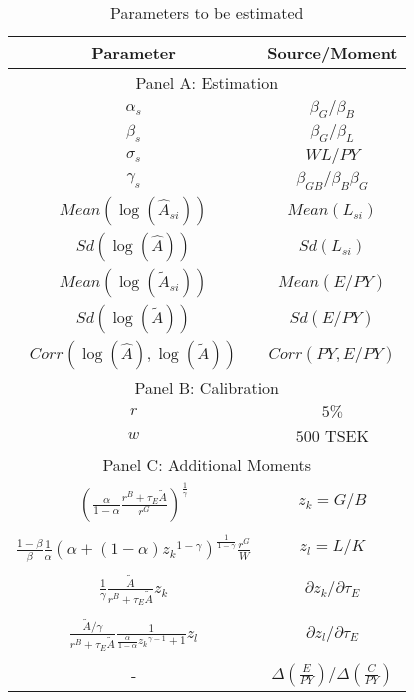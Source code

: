 \begin{table}[http]
    \centering
    \caption{\quad Parameters to be estimated} \label{tab:estimate_parameters}
    \vspace*{2mm}
    \begin{tabular}{@{}cc@{}}
    \toprule
    \textbf{Parameter}  & \textbf{Source/Moment}\\
    \midrule 
    \multicolumn{2}{c}{Panel A: Estimation} \\
    \midrule
    $\alpha_s$ & ${\beta_G}/{\beta_B}$ \\
    $\beta_s$ & ${\beta_G}/{\beta_L}$\\ 
    $\sigma_s$ & $WL/PY$\\
    $\gamma_s$ & ${\beta_{GB}}/{\beta_B\beta_G}$\\
    $Mean(\log(\hat{A}_{si})) $ & $Mean({L}_{si})$\\
    $Sd(\log({\hat{A}}))$ & $Sd({L}_{si})$\\
    $Mean(\log(\tilde{A}_{si})) $ & $Mean({E/PY})$\\
    $Sd({\log(\tilde{A})})$ & $Sd({E/PY})$\\
    $Corr(\log(\hat{A}),\log(\tilde{A}))$ & $Corr(PY,E/PY)$\\
    \midrule
    \multicolumn{2}{c}{Panel B: Calibration} \\
    \midrule
    $r$ & $5\%$  \\
    $w$ & $500$ TSEK  \\
    \midrule
    \multicolumn{2}{c}{Panel C: Additional Moments} \\
    \midrule
    $ \left(
            \frac{\alpha}{1-\alpha} \frac{r^B + {\tau_E}\tilde{A}}{r^G}
        \right) ^{\frac{1}{\gamma}}$ & $z_k= G/B$ \\\\
    $\frac{1-\beta}{\beta}\frac{1}{\alpha}\left(
        \alpha + (1-\alpha) {{z_k}}^{1-\gamma}
    \right)^{\frac{1}{1-\gamma}} \frac{r^G}{W}$ & $z_l = L/K$ \\\\
    $\frac{1}{\gamma} \frac{\tilde{A}}{r^B + \tau_E\tilde{A}} z_k$ & ${\partial z_k/\partial \tau_E }$ \\\\
    $\frac{\tilde{A}/\gamma}{r^B + \tau_E\tilde{A}}\frac{1}{\frac{\alpha}{1-\alpha}{{z_k}}^{\gamma-1} + 1}{z_l}$ &   $\partial z_l/\partial \tau_E$\\\\
    - & $\Delta(\frac{E}{PY})/\Delta(\frac{C}{PY}) $ \\
    \bottomrule
\end{tabular}
\end{table}





